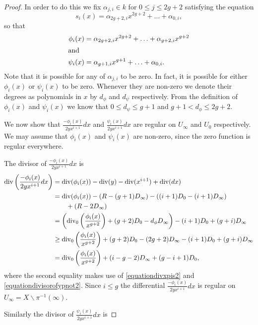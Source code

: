 \begin{proof}
    
    In order to do this we fix $\alpha_{j,i} \in k$ for $0\leq j \leq 2g+2$ satisfying the equation
        \[
        s_i(x) = \alpha_{2g+2,i}x^{2g+2} + \ldots + \alpha_{0,i},
        \]
    so that
        \begin{align*}
        \phi_i(x) & = \alpha_{2g+2,i}x^{2g+2} + \ldots + \alpha_{g+2,i}x^{g+2} \\
        \intertext{and }
        \psi_i(x) & = \alpha_{g+1,i}x^{g+1} + \ldots + \alpha_{0,i}.
        \end{align*}
    Note that it is possible for any of $\alpha_{j,i}$ to be zero. In fact, it is possible for either $\phi_i(x)$ or $\psi_i(x)$ to be zero.
    Whenever they are non-zero we denote their degrees as polynomials in $x$ by $d_\phi$ and $d_\psi$ respectively. From the definition of $\phi_i(x)$ and $\psi_i(x)$ we know that $0 \leq d_\psi \leq g+1$ and $g+1 < d_\phi \leq 2g+2$.
    
    
    We now show that $\frac{-\phi_i(x)}{2yx^{i+1}}dx$ and $\frac{\psi_i(x)}{2yx^{i+1}}dx$ are regular on $U_\infty$ and $U_0$ respectively.
    We may assume that $\phi_i(x)$ and $\psi_i(x)$ are non-zero, since the zero function is regular everywhere.
    
    
    The divisor of $\frac{-\phi_i(x)}{2yx^{i+1}}dx$ is
        \begin{align*}
        \operatorname{div}\left( \frac{-\phi_i(x)}{2yx^{i+1}}dx \right) & =  \operatorname{div}(\phi_i(x)) -\operatorname{div}(y) - \operatorname{div}(x^{i+1}) + \operatorname{div} (dx) \\
        & =  \operatorname{div}(\phi_i(x)) - ( R - (g+1)D_\infty) - ((i+1)D_0 - (i+1)D_\infty) \\
        & \qquad + (R - 2D_\infty) \\
        & =  \left( \operatorname{div}_0\left( \frac{\phi_i(x)}{x^{g+2}}\right) + (g+2)D_0 - d_\phi D_\infty\right) - (i+1)D_0 + (g+i)D_\infty \\
        & \geq  \operatorname{div}_0\left( \frac{\phi_i(x)}{x^{g+2}}\right) + (g+2)D_0 - (2g+2)D_\infty - (i+1)D_0 + (g+i)D_\infty \\
        & =  \operatorname{div}_0\left( \frac{\phi_i(x)}{x^{g+2}} \right) + (i-g-2)D_\infty + (g-i+1)D_0,
        \end{align*}
    where the second equality makes use of \eqref{equationdivxpis2} and \eqref{equationdivisorofypnot2}.
    Since $i \leq g$ the differential $\frac{-\phi_i(x)}{2yx^{i+1}}dx$ is regular on $U_\infty = X\backslash \pi^{-1}(\infty)$.
    
    Similarly the divisor of $\frac{\psi_i(x)}{2yx^{i+1}}dx$ is
    

\end{proof}
